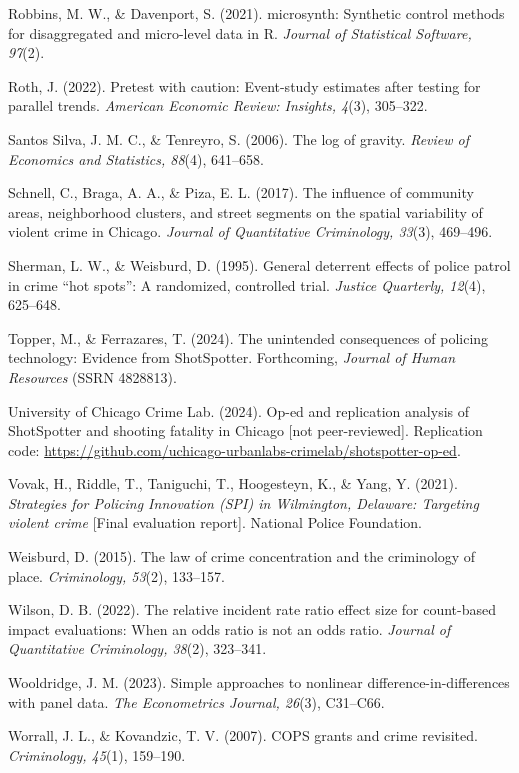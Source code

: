 \documentclass[12pt]{article}
\begin{document}
\begin{flushleft}
Robbins, M. W., \& Davenport, S. (2021). microsynth: Synthetic control methods for
disaggregated and micro-level data in R. \emph{Journal of Statistical Software, 97}(2).

Roth, J. (2022). Pretest with caution: Event-study estimates after testing for parallel
trends. \emph{American Economic Review: Insights, 4}(3), 305--322.

Santos Silva, J. M. C., \& Tenreyro, S. (2006). The log of gravity. \emph{Review of
Economics and Statistics, 88}(4), 641--658.

Schnell, C., Braga, A. A., \& Piza, E. L. (2017). The influence of community areas,
neighborhood clusters, and street segments on the spatial variability of violent crime in
Chicago. \emph{Journal of Quantitative Criminology, 33}(3), 469--496.

Sherman, L. W., \& Weisburd, D. (1995). General deterrent effects of police patrol in crime
``hot spots'': A randomized, controlled trial. \emph{Justice Quarterly, 12}(4), 625--648.

Topper, M., \& Ferrazares, T. (2024). The unintended consequences of policing technology:
Evidence from ShotSpotter. Forthcoming, \emph{Journal of Human Resources} (SSRN 4828813).

University of Chicago Crime Lab. (2024). Op-ed and replication analysis of ShotSpotter and
shooting fatality in Chicago [not peer-reviewed]. Replication code:
\url{https://github.com/uchicago-urbanlabs-crimelab/shotspotter-op-ed}.

Vovak, H., Riddle, T., Taniguchi, T., Hoogesteyn, K., \& Yang, Y. (2021). \emph{Strategies
for Policing Innovation (SPI) in Wilmington, Delaware: Targeting violent crime} [Final
evaluation report]. National Police Foundation.

Weisburd, D. (2015). The law of crime concentration and the criminology of place.
\emph{Criminology, 53}(2), 133--157.

Wilson, D. B. (2022). The relative incident rate ratio effect size for count-based impact
evaluations: When an odds ratio is not an odds ratio. \emph{Journal of Quantitative
Criminology, 38}(2), 323--341.

Wooldridge, J. M. (2023). Simple approaches to nonlinear difference-in-differences with
panel data. \emph{The Econometrics Journal, 26}(3), C31--C66.

Worrall, J. L., \& Kovandzic, T. V. (2007). COPS grants and crime revisited.
\emph{Criminology, 45}(1), 159--190.

\end{flushleft}
\end{document}
